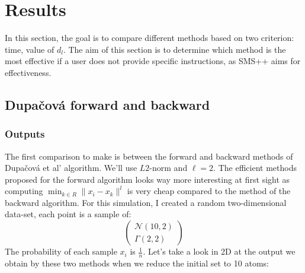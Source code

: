 \documentclass{amsart}
\begin{document}
\section{Results}
In this section, the goal is to compare different methods based on two criterion: time, value of $d_l$. The aim of this section is to determine which method is the most effective if a user does not provide specific instructions, as SMS++ aims for effectiveness.
\subsection{Dupačová forward and backward}
\subsubsection{Outputs}
The first comparison to make is between the forward and backward methods of Dupačová et al' algorithm. We'll use $L2$-norm and $\ell=2$. The efficient methods proposed for the forward algorithm looks way more interesting at first sight as computing $\min_{k\in R}\lVert x_i-x_k\rVert^l$ is very cheap compared to the method of the backward algorithm. For this simulation, I created a random two-dimensional data-set, each point is a sample of: $$
\begin{pmatrix}
    \mathcal{N}\left(10,2\right) \\ \Gamma\left(2,2\right)
\end{pmatrix}
$$
The probability of each sample $x_i$ is $\frac{1}{n}$. Let's take a look in 2D at the output we obtain by these two methods when we reduce the initial set to 10 atoms: 
\end{document}

